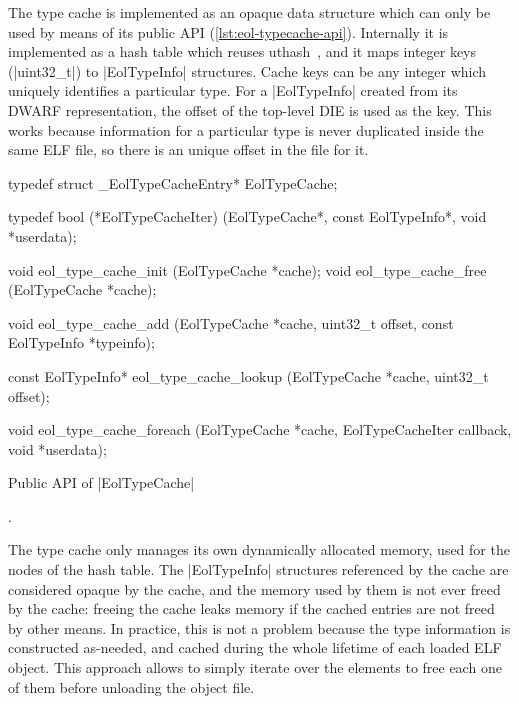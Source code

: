 The type cache is implemented as an opaque data structure which can only be
used by means of its public API (\autoref{lst:eol-typecache-api}). Internally
it is implemented as a hash table which reuses uthash~\cite{uthash-guide}, and
it maps integer keys (\Mc|uint32_t|) to \Mc|EolTypeInfo| structures. Cache
keys can be any integer which uniquely identifies a particular type.
For a \Mc|EolTypeInfo| created from its DWARF representation, the offset of
the top-level \gls{DIE} is used as the key. This works because information for
a particular type is never duplicated inside the same ELF file, so there is an
unique offset in the file for it.

\begin{listing}[tH]
  \centering
\begin{ccode}
typedef struct _EolTypeCacheEntry* EolTypeCache;

typedef bool (*EolTypeCacheIter)  (EolTypeCache*,
                                   const EolTypeInfo*,
                                   void *userdata);

void eol_type_cache_init (EolTypeCache *cache);
void eol_type_cache_free (EolTypeCache *cache);

void eol_type_cache_add (EolTypeCache      *cache,
                         uint32_t           offset,
                         const EolTypeInfo *typeinfo);

const EolTypeInfo* eol_type_cache_lookup (EolTypeCache *cache,
                                          uint32_t      offset);

void eol_type_cache_foreach (EolTypeCache    *cache,
                             EolTypeCacheIter callback,
                             void             *userdata);
\end{ccode}
  \caption{Public API of \Mc|EolTypeCache|}.
  \label{lst:eol-typecache-api}
\end{listing}

The type cache only manages its own dynamically allocated memory, used for the
nodes of the hash table. The \Mc|EolTypeInfo| structures referenced by the
cache are considered opaque by the cache, and the memory used by them is not
ever freed by the cache: freeing the cache leaks memory if the cached entries
are not freed by other means. In practice, this is not a problem because the
type information is constructed as-needed, and cached during the whole
lifetime of each loaded ELF object. This approach allows to simply iterate
over the elements to free each one of them before unloading the object file.


